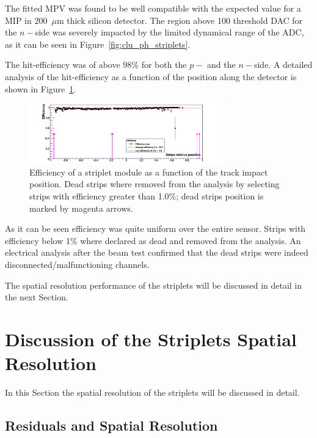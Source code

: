 The fitted MPV was found to be well compatible with the expected  value for a MIP in 200~$\mu$m 
thick silicon detector. The region above 100 threshold DAC for the $n-$side was severely impacted 
by the limited dynamical range of the ADC, as it can be seen in Figure~\ref{fig:clu_ph_striplets}.

The hit-efficiency was of above 98\% for both the $p-$ and the $n-$side. A detailed analysis 
of the hit-efficiency as a function of the position along the detector is shown in 
Figure~\ref{fig:striplets_eff}.
\begin{figure}[!htpb]
\centering
\includegraphics[width=0.75\textwidth]{striplets_eff.png}
\caption{\label{fig:striplets_eff}Efficiency of a striplet module as a function of the track impact position. 
Dead strips where removed from the analysis by selecting strips with efficiency greater than 1.0\%; 
dead strips position is marked by magenta arrows.}
\end{figure}

As it can be seen efficiency was quite uniform
over the entire sensor. Strips with efficiency below 1\% where declared as dead and removed from the 
analysis. An electrical analysis after the beam test confirmed that  the dead strips 
were indeed disconnected/malfunctioning channels. 

The spatial resolution performance of the striplets will be discussed in detail in the next Section.

\section{Discussion of the Striplets Spatial Resolution}
\label{sec:striplets_res}

In this Section the spatial resolution of the striplets will be discussed in detail. 

\subsection{Residuals and Spatial Resolution}

